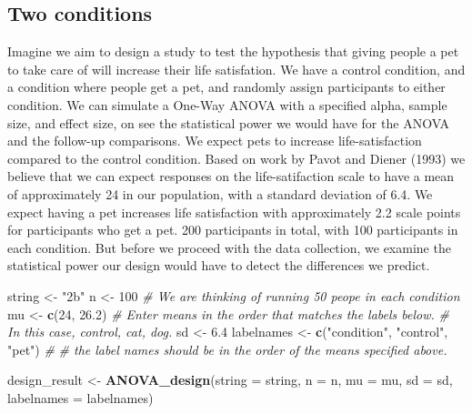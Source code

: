 \documentclass[]{article}
\newenvironment{Shaded}{\begin{snugshade}}{\end{snugshade}}
\newcommand{\KeywordTok}[1]{\textcolor[rgb]{0.13,0.29,0.53}{\textbf{#1}}}
\newcommand{\DataTypeTok}[1]{\textcolor[rgb]{0.13,0.29,0.53}{#1}}
\newcommand{\DecValTok}[1]{\textcolor[rgb]{0.00,0.00,0.81}{#1}}
\newcommand{\FloatTok}[1]{\textcolor[rgb]{0.00,0.00,0.81}{#1}}
\newcommand{\StringTok}[1]{\textcolor[rgb]{0.31,0.60,0.02}{#1}}
\newcommand{\CommentTok}[1]{\textcolor[rgb]{0.56,0.35,0.01}{\textit{#1}}}
\newcommand{\NormalTok}[1]{#1}
\begin{document}
\subsection{Two conditions}\label{two-conditions}

Imagine we aim to design a study to test the hypothesis that giving
people a pet to take care of will increase their life satisfation. We
have a control condition, and a condition where people get a pet, and
randomly assign participants to either condition. We can simulate a
One-Way ANOVA with a specified alpha, sample size, and effect size, on
see the statistical power we would have for the ANOVA and the follow-up
comparisons. We expect pets to increase life-satisfaction compared to
the control condition. Based on work by Pavot and Diener (1993) we
believe that we can expect responses on the life-satifaction scale to
have a mean of approximately 24 in our population, with a standard
deviation of 6.4. We expect having a pet increases life satisfaction
with approximately 2.2 scale points for participants who get a pet. 200
participants in total, with 100 participants in each condition. But
before we proceed with the data collection, we examine the statistical
power our design would have to detect the differences we predict.

\begin{Shaded}
\begin{Highlighting}[]
\NormalTok{string <-}\StringTok{ "2b"}
\NormalTok{n <-}\StringTok{ }\DecValTok{100}
\CommentTok{# We are thinking of running 50 peope in each condition}
\NormalTok{mu <-}\StringTok{ }\KeywordTok{c}\NormalTok{(}\DecValTok{24}\NormalTok{, }\FloatTok{26.2}\NormalTok{)}
\CommentTok{# Enter means in the order that matches the labels below.}
\CommentTok{# In this case, control, cat, dog. }
\NormalTok{sd <-}\StringTok{ }\FloatTok{6.4}
\NormalTok{labelnames <-}\StringTok{ }\KeywordTok{c}\NormalTok{(}\StringTok{"condition"}\NormalTok{, }\StringTok{"control"}\NormalTok{, }\StringTok{"pet"}\NormalTok{) }\CommentTok{#}
\CommentTok{# the label names should be in the order of the means specified above.}

\NormalTok{design_result <-}\StringTok{ }\KeywordTok{ANOVA_design}\NormalTok{(}\DataTypeTok{string =}\NormalTok{ string,}
                   \DataTypeTok{n =}\NormalTok{ n, }
                   \DataTypeTok{mu =}\NormalTok{ mu, }
                   \DataTypeTok{sd =}\NormalTok{ sd, }
                   \DataTypeTok{labelnames =}\NormalTok{ labelnames)}
\end{Highlighting}
\end{Shaded}
\end{document}
